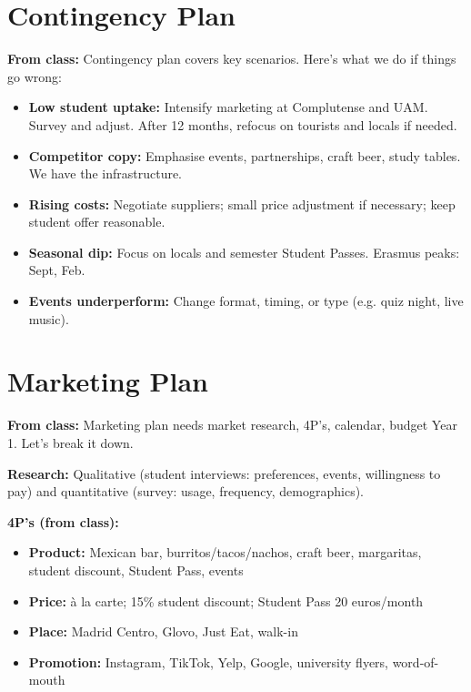 \documentclass[11pt,a4paper]{article}
\begin{document}
\vspace{1em}

\section{Contingency Plan}

\textbf{From class:} Contingency plan covers key scenarios. Here's what we do if things go wrong:

\begin{itemize}[leftmargin=*,nosep]
\item \textbf{Low student uptake:} Intensify marketing at Complutense and UAM. Survey and adjust. After 12 months, refocus on tourists and locals if needed.
\item \textbf{Competitor copy:} Emphasise events, partnerships, craft beer, study tables. We have the infrastructure.
\item \textbf{Rising costs:} Negotiate suppliers; small price adjustment if necessary; keep student offer reasonable.
\item \textbf{Seasonal dip:} Focus on locals and semester Student Passes. Erasmus peaks: Sept, Feb.
\item \textbf{Events underperform:} Change format, timing, or type (e.g. quiz night, live music).
\end{itemize}

\vspace{1em}

\section{Marketing Plan}

\textbf{From class:} Marketing plan needs market research, 4P's, calendar, budget Year 1. Let's break it down.

\textbf{Research:} Qualitative (student interviews: preferences, events, willingness to pay) and quantitative (survey: usage, frequency, demographics).

\textbf{4P's (from class):}
\begin{itemize}[leftmargin=*,nosep]
\item \textbf{Product:} Mexican bar, burritos/tacos/nachos, craft beer, margaritas, student discount, Student Pass, events
\item \textbf{Price:} \`a la carte; 15\% student discount; Student Pass 20 euros/month
\item \textbf{Place:} Madrid Centro, Glovo, Just Eat, walk-in
\item \textbf{Promotion:} Instagram, TikTok, Yelp, Google, university flyers, word-of-mouth
\end{itemize}
\end{document}
